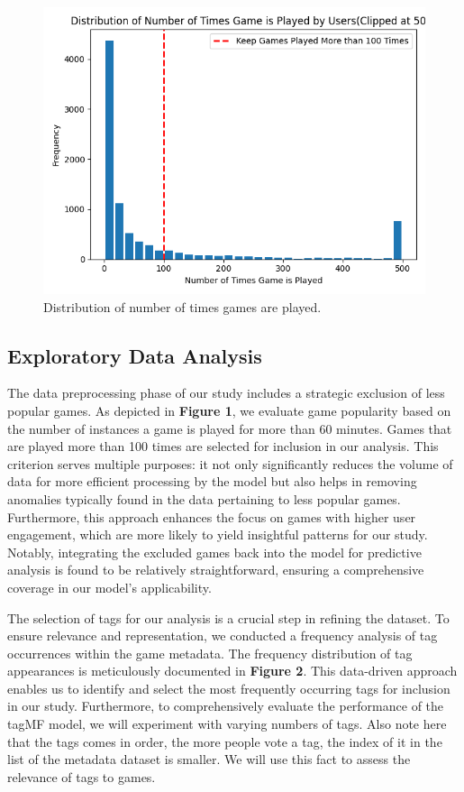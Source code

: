 \documentclass[sigplan,screen]{acmart}
\begin{document}
\begin{figure}[h]
  \centering
  \includegraphics[width=\linewidth]{game_played_hist.png}
  \caption{Distribution of number of times games are played.}
\end{figure}
\subsection{Exploratory Data Analysis}

The data preprocessing phase of our study includes a strategic exclusion of less popular games. As depicted in \textbf{Figure 1}, we evaluate game popularity based on the number of instances a game is played for more than 60 minutes. Games that are played more than 100 times are selected for inclusion in our analysis. This criterion serves multiple purposes: it not only significantly reduces the volume of data for more efficient processing by the model but also helps in removing anomalies typically found in the data pertaining to less popular games. Furthermore, this approach enhances the focus on games with higher user engagement, which are more likely to yield insightful patterns for our study. Notably, integrating the excluded games back into the model for predictive analysis is found to be relatively straightforward, ensuring a comprehensive coverage in our model's applicability.

The selection of tags for our analysis is a crucial step in refining the dataset. To ensure relevance and representation, we conducted a frequency analysis of tag occurrences within the game metadata. The frequency distribution of tag appearances is meticulously documented in \textbf{Figure 2}. This data-driven approach enables us to identify and select the most frequently occurring tags for inclusion in our study. Furthermore, to comprehensively evaluate the performance of the tagMF model, we will experiment with varying numbers of tags. Also note here that the tags comes in order, the more people vote a tag, the index of it in the list of the metadata dataset is smaller. We will use this fact to assess the relevance of tags to games.
\end{document}
